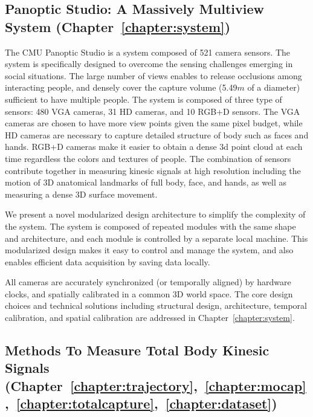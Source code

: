 \subsection{Panoptic Studio: A Massively Multiview System (Chapter~\ref{chapter:system})}
The CMU Panoptic Studio is a system composed of 521 camera sensors. The system is specifically designed to overcome the sensing challenges emerging in social situations. The large number of views enables to release occlusions among interacting people, and densely cover the capture volume (5.49$m$ of a diameter) sufficient to have multiple people. The system is composed of three type of sensors: 480 VGA cameras, 31 HD cameras, and 10 RGB+D sensors. The VGA cameras are chosen to have more view points given the same pixel budget, while HD cameras are necessary to capture detailed structure of body such as faces and hands. RGB+D cameras make it easier to obtain a dense 3d point cloud at each time regardless the colors and textures of people. The combination of sensors contribute together in measuring kinesic signals at high resolution including the motion of 3D anatomical landmarks of full body, face, and hands, as well as measuring a dense 3D surface movement. 

We present a novel modularized design architecture to simplify the complexity of the system. The system is composed of repeated modules with the same shape and architecture, and each module is controlled by a separate local machine. This modularized design makes it easy to control and manage the system, and also enables efficient data acquisition by saving data locally. 

All cameras are accurately synchronized (or temporally aligned) by hardware clocks, and spatially calibrated in a common 3D world space. The core design choices and technical solutions including structural design, architecture, temporal calibration, and spatial calibration are addressed in Chapter~\ref{chapter:system}.

\subsection{Methods To Measure Total Body Kinesic Signals (Chapter~\ref{chapter:trajectory},~\ref{chapter:mocap},~\ref{chapter:totalcapture},~\ref{chapter:dataset})}

